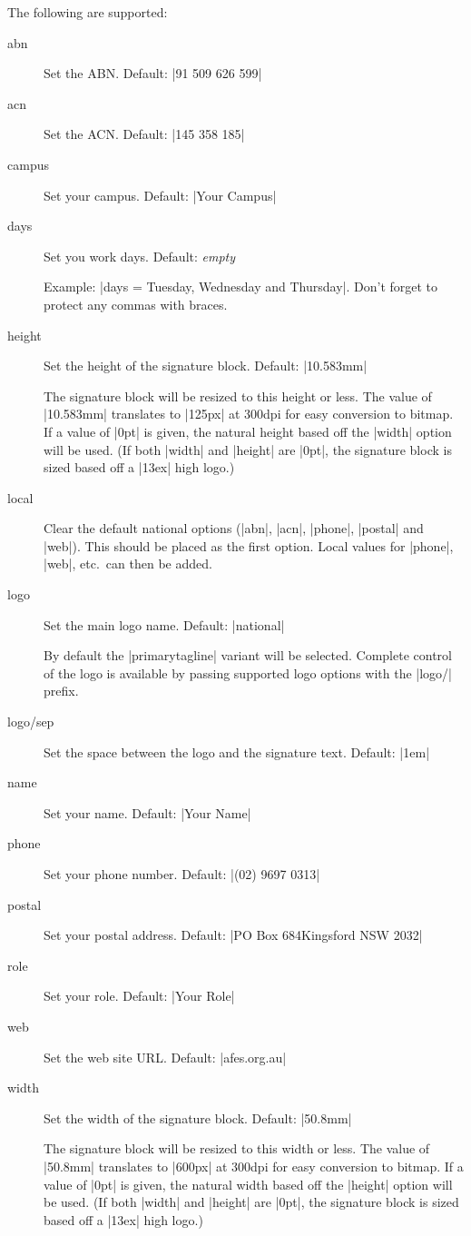 \documentclass[a4paper]{l3doc}
\begin{document}
The following  are supported:

\begin{description}
  \item[abn] Set the ABN. Default: |91 509 626 599|
  \item[acn] Set the ACN. Default: |145 358 185|
  \item[campus] Set your campus. Default: |Your Campus|
  \item[days] Set you work days. Default: \emph{empty}

    Example: |days = {Tuesday, Wednesday and Thursday}|. Don't forget to
    protect any commas with braces.

  \item[height] Set the height of the signature block. Default: |10.583mm|

    The signature block will be resized to this height or less. The value of
    |10.583mm| translates to |125px| at 300dpi for easy conversion to bitmap.
    If a value of |0pt| is given, the natural height based off the |width|
    option will be used. (If both |width| and |height| are |0pt|, the
    signature block is sized based off a |13ex| high logo.)

  \item[local] Clear the default national options (|abn|, |acn|, |phone|,
    |postal| and |web|). This should be placed as the first option. Local
    values for |phone|, |web|, etc.\ can then be added.
  \item[logo] Set the main logo name. Default: |national|

    By default the |primarytagline| variant will be selected. Complete control
    of the logo is available by passing supported logo options with the
    |logo/| prefix.

  \item[logo/sep] Set the space between the logo and the signature text.
    Default: |1em|
  \item[name] Set your name. Default: |Your Name|
  \item[phone] Set your phone number. Default: |(02) 9697 0313|
  \item[postal] Set your postal address. Default: |PO Box 684\break Kingsford NSW 2032|
  \item[role] Set your role. Default: |Your Role|
  \item[web] Set the web site URL. Default: |afes.org.au|
  \item[width] Set the width of the signature block. Default: |50.8mm|

    The signature block will be resized to this width or less. The value of
    |50.8mm| translates to |600px| at 300dpi for easy conversion to bitmap.
    If a value of |0pt| is given, the natural width based off the |height|
    option will be used. (If both |width| and |height| are |0pt|, the
    signature block is sized based off a |13ex| high logo.)
\end{description}
\end{document}

